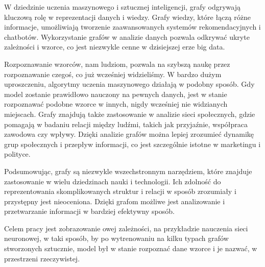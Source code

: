 W dziedzinie uczenia maszynowego i sztucznej inteligencji, grafy odgrywają kluczową rolę w reprezentacji danych i wiedzy.
Grafy wiedzy, które łączą różne informacje, umożliwiają tworzenie zaawansowanych systemów rekomendacyjnych i chatbotów.
Wykorzystanie grafów w analizie danych pozwala odkrywać ukryte zależności i wzorce, co jest niezwykle cenne w dzisiejszej erze big data.

Rozpoznawanie wzorców, nam ludziom, pozwala na szybszą naukę przez rozpoznawanie czegoś, co już wcześniej widzieliśmy.
W bardzo dużym uproszczeniu, algorytmy uczenia maszynowego działają w podobny sposób.
Gdy model zostanie prawidłowo nauczony na pewnych danych, jest w stanie rozpoznawać podobne wzorce w innych,
nigdy wcześniej nie widzianych miejscach.
Grafy znajdują także zastosowanie w analizie sieci społecznych, gdzie pomagają w badaniu relacji między ludźmi,
takich jak przyjaźnie, współpraca zawodowa czy wpływy.
Dzięki analizie grafów można lepiej zrozumieć dynamikę grup społecznych i przepływ informacji,
co jest szczególnie istotne w marketingu i polityce.

Podsumowując, grafy są niezwykle wszechstronnym narzędziem, które znajduje zastosowanie w wielu dziedzinach nauki i technologii.
Ich zdolność do reprezentowania skomplikowanych struktur i relacji w sposób zrozumiały i przystępny jest nieoceniona.
Dzięki grafom możliwe jest analizowanie i przetwarzanie informacji w bardziej efektywny sposób. 

Celem pracy jest zobrazowanie owej zależności, na przykładzie nauczenia sieci neuronowej,
w taki sposób, by po wytrenowaniu na kilku typach grafów stworzonych sztucznie,
model był w stanie rozpoznać dane wzorce i je nazwać, w przestrzeni rzeczywistej.